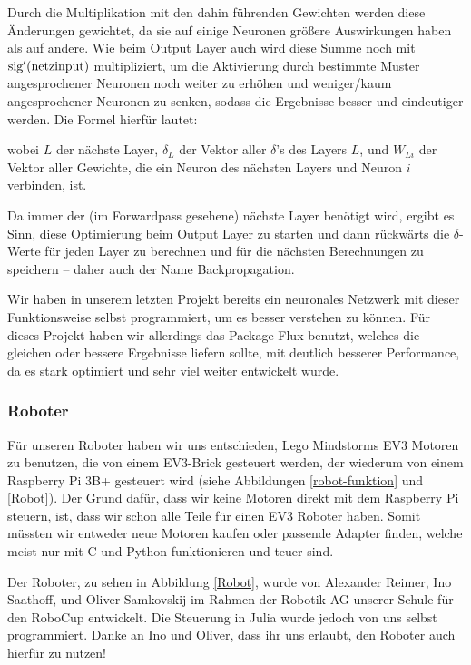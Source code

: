 \documentclass[11pt]{scrartcl}
\begin{document}
	Durch die Multiplikation mit den dahin führenden Gewichten werden diese Änderungen gewichtet, da sie auf einige Neuronen größere Auswirkungen haben als auf andere. Wie beim Output Layer auch wird diese Summe noch mit $\textrm{sig}'(\textrm{netzinput})$ multipliziert, um die Aktivierung durch bestimmte Muster angesprochener Neuronen noch weiter zu erhöhen und weniger/kaum angesprochener Neuronen zu senken, sodass die Ergebnisse besser und eindeutiger werden. Die Formel hierfür lautet:


	\noindent wobei $L$ der nächste Layer, $\delta_L$ der Vektor aller $\delta$'s des Layers $L$, und $W_{Li}$ der Vektor aller Gewichte, die ein Neuron des nächsten Layers und Neuron $i$ verbinden, ist.


	Da immer der (im Forwardpass gesehene) nächste Layer benötigt wird, ergibt es Sinn, diese Optimierung beim Output Layer zu starten und dann rückwärts die \mbox{$\delta$-Werte} für jeden Layer zu berechnen und für die nächsten Berechnungen zu speichern -- daher auch der Name Backpropagation. \cite{MITNeuronale} \cite{3b1b:nn} \cite{brotcrunsher:backwardpass}


	Wir haben in unserem letzten Projekt bereits ein neuronales Netzwerk mit dieser Funktionsweise selbst programmiert, um es besser verstehen zu können. \cite{AIComposer} Für dieses Projekt haben wir allerdings das Package Flux benutzt, welches die gleichen oder bessere Ergebnisse liefern sollte, mit deutlich besserer Performance, da es stark optimiert und sehr viel weiter entwickelt wurde. \cite{Flux.jl-2018}

	\subsubsection{Roboter}

	Für unseren Roboter haben wir uns entschieden, Lego Mindstorms EV3 Motoren zu benutzen, die von einem EV3-Brick gesteuert werden, der wiederum von einem Raspberry Pi 3B+ gesteuert wird (siehe Abbildungen \ref{robot-funktion} und \ref{Robot}). Der Grund dafür, dass wir keine Motoren direkt mit dem Raspberry Pi steuern, ist, dass wir schon alle Teile für einen EV3 Roboter haben. Somit müssten wir entweder neue Motoren kaufen oder passende Adapter finden, welche meist nur mit C und Python funktionieren und teuer sind.

	Der Roboter, zu sehen in Abbildung \ref{Robot}, wurde von Alexander Reimer, Ino Saathoff, und Oliver Samkovskij im Rahmen der Robotik-AG unserer Schule für den RoboCup entwickelt. Die Steuerung in Julia wurde jedoch von uns selbst programmiert. Danke an Ino und Oliver, dass ihr uns erlaubt, den Roboter auch hierfür zu nutzen!
\end{document}
